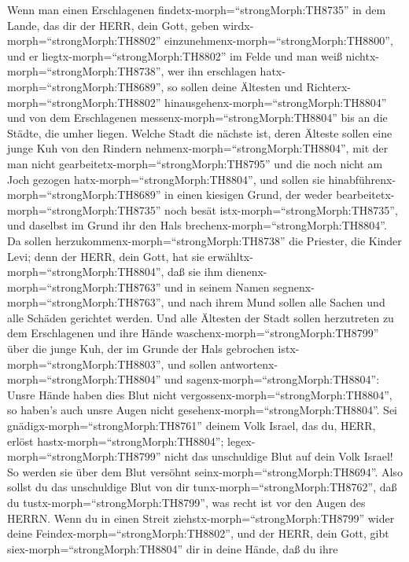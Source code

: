  Wenn man einen Erschlagenen
findetx-morph=``strongMorph:TH8735'' in dem Lande, das dir der HERR,
dein Gott, geben wirdx-morph=``strongMorph:TH8802''
einzunehmenx-morph=``strongMorph:TH8800'', und er
liegtx-morph=``strongMorph:TH8802'' im Felde und man weiß
nichtx-morph=``strongMorph:TH8738'', wer ihn erschlagen
hatx-morph=``strongMorph:TH8689'',  so sollen deine Ältesten
und Richterx-morph=``strongMorph:TH8802''
hinausgehenx-morph=``strongMorph:TH8804'' und von dem Erschlagenen
messenx-morph=``strongMorph:TH8804'' bis an die Städte, die umher
liegen.  Welche Stadt die nächste ist, deren Älteste sollen
eine junge Kuh von den Rindern nehmenx-morph=``strongMorph:TH8804'', mit
der man nicht gearbeitetx-morph=``strongMorph:TH8795'' und die noch
nicht am Joch gezogen hatx-morph=``strongMorph:TH8804'', 
und sollen sie hinabführenx-morph=``strongMorph:TH8689'' in einen
kiesigen Grund, der weder bearbeitetx-morph=``strongMorph:TH8735'' noch
besät istx-morph=``strongMorph:TH8735'', und daselbst im Grund ihr den
Hals brechenx-morph=``strongMorph:TH8804''.  Da sollen
herzukommenx-morph=``strongMorph:TH8738'' die Priester, die Kinder Levi;
denn der HERR, dein Gott, hat sie erwähltx-morph=``strongMorph:TH8804'',
daß sie ihm dienenx-morph=``strongMorph:TH8763'' und in seinem Namen
segnenx-morph=``strongMorph:TH8763'', und nach ihrem Mund sollen alle
Sachen und alle Schäden gerichtet werden.  Und alle Ältesten
der Stadt sollen herzutreten zu dem Erschlagenen und ihre Hände
waschenx-morph=``strongMorph:TH8799'' über die junge Kuh, der im Grunde
der Hals gebrochen istx-morph=``strongMorph:TH8803'',  und
sollen antwortenx-morph=``strongMorph:TH8804'' und
sagenx-morph=``strongMorph:TH8804'': Unsre Hände haben dies Blut nicht
vergossenx-morph=``strongMorph:TH8804'', so haben's auch unsre Augen
nicht gesehenx-morph=``strongMorph:TH8804''.  Sei
gnädigx-morph=``strongMorph:TH8761'' deinem Volk Israel, das du, HERR,
erlöst hastx-morph=``strongMorph:TH8804'';
legex-morph=``strongMorph:TH8799'' nicht das unschuldige Blut auf dein
Volk Israel! So werden sie über dem Blut versöhnt
seinx-morph=``strongMorph:TH8694''.  Also sollst du das
unschuldige Blut von dir tunx-morph=``strongMorph:TH8762'', daß du
tustx-morph=``strongMorph:TH8799'', was recht ist vor den Augen des
HERRN.  Wenn du in einen Streit
ziehstx-morph=``strongMorph:TH8799'' wider deine
Feindex-morph=``strongMorph:TH8802'', und der HERR, dein Gott, gibt
siex-morph=``strongMorph:TH8804'' dir in deine Hände, daß du ihre
